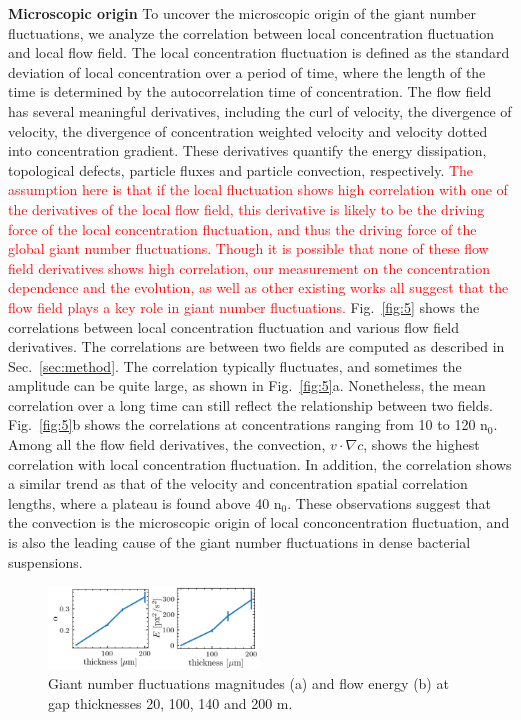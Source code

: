 \documentclass[twocolumn,aps,pre,amsmath,amssymb,longbibliography]{revtex4-1}
\begin{document}
\textbf{Microscopic origin} To uncover the microscopic origin of the giant number fluctuations, we analyze the correlation between local concentration fluctuation and local flow field. The local concentration fluctuation is defined as the standard deviation of local concentration over a period of time, where the length of the time is determined by the autocorrelation time of concentration. The flow field has several meaningful derivatives, including the curl of velocity, the divergence of velocity, the divergence of concentration weighted velocity and velocity dotted into concentration gradient. These derivatives quantify the energy dissipation, topological defects, particle fluxes and particle convection, respectively. \textcolor{red}{The assumption here is that if the local fluctuation shows high correlation with one of the derivatives of the local flow field, this derivative is likely to be the driving force of the local concentration fluctuation, and thus the driving force of the global giant number fluctuations. Though it is possible that none of these flow field derivatives shows high correlation, our measurement on the concentration dependence and the evolution, as well as other existing works \cite{PhysRevLett.100.178103, Schaller4488} all suggest that the flow field plays a key role in giant number fluctuations.} Fig.~\ref{fig:5} shows the correlations between local concentration fluctuation and various flow field derivatives. The correlations are between two fields are computed as described in Sec.~\ref{sec:method}. The correlation typically fluctuates, and sometimes the amplitude can be quite large, as shown in Fig.~\ref{fig:5}a. Nonetheless, the mean correlation over a long time can still reflect the relationship between two fields.
Fig.~\ref{fig:5}b shows the correlations at concentrations ranging from 10 to 120 n$_0$.
Among all the flow field derivatives, the convection, $v\cdot\nabla c$, shows the highest correlation with local concentration fluctuation. In addition, the correlation shows a similar trend as that of the velocity and concentration spatial correlation lengths, where a plateau is found above 40 n$_0$. These observations suggest that the convection is the microscopic origin of local conconcentration fluctuation, and is also the leading cause of the giant number fluctuations in dense bacterial suspensions.

\begin{figure}[h]
\begin{center}
\includegraphics[width=0.5\textwidth]{GNF_figure-6-v1.png}
\caption[]{Giant number fluctuations magnitudes (a) and flow energy (b) at gap thicknesses 20, 100, 140 and 200 \textmu m.  }
\label{fig:6}
\end{center}
\end{figure}
\end{document}
